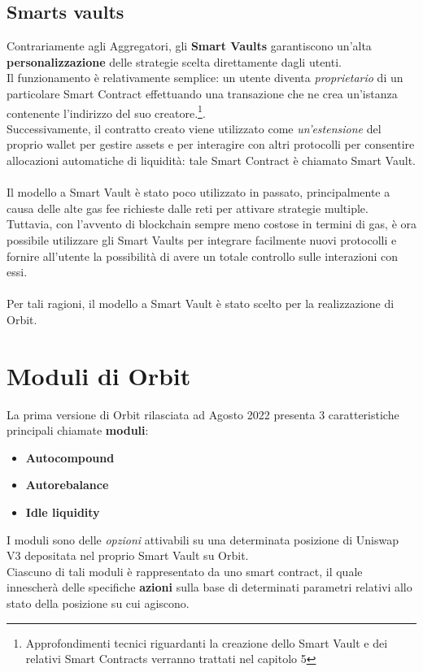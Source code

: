 \documentclass[12pt,a4paper]{report}
\begin{document}
\subsection{Smarts vaults}

Contrariamente agli Aggregatori, gli \textbf{Smart Vaults} garantiscono un'alta \textbf{personalizzazione} delle strategie scelta direttamente dagli utenti.
\\Il funzionamento è relativamente semplice: un utente diventa \textit{proprietario} di un particolare Smart Contract effettuando una transazione che ne crea un'istanza contenente l'indirizzo del suo creatore.\footnote{Approfondimenti tecnici riguardanti la creazione dello Smart Vault e dei relativi Smart Contracts verranno trattati nel capitolo 5}.
\\Successivamente, il contratto creato viene utilizzato come \textit{un'estensione} del proprio wallet per gestire assets e per interagire con altri protocolli per consentire allocazioni automatiche di liquidità: tale Smart Contract è chiamato Smart Vault.
\\\\Il modello a Smart Vault è stato poco utilizzato in passato, principalmente a causa delle alte gas fee richieste dalle reti per attivare strategie multiple.
\\Tuttavia, con l'avvento di blockchain sempre meno costose in termini di gas, è ora possibile utilizzare gli Smart Vaults per integrare facilmente nuovi protocolli e fornire all'utente la possibilità di avere un totale controllo sulle interazioni con essi.
\\\\Per tali ragioni, il modello a Smart Vault è stato scelto per la realizzazione di Orbit.

\section{Moduli di Orbit}

La prima versione di Orbit rilasciata ad Agosto 2022 presenta 3 caratteristiche principali chiamate \textbf{moduli}: 

\begin{itemize}
  \item \textbf{Autocompound}
  \item \textbf{Autorebalance}
  \item \textbf{Idle liquidity}
\end{itemize}
\textbf{\list}
\noindent I moduli sono delle \textit{opzioni} attivabili su una determinata posizione di Uniswap V3 depositata nel proprio Smart Vault su Orbit. \\Ciascuno di tali moduli è rappresentato da uno smart contract, il quale innescherà delle specifiche \textbf{azioni} sulla base di determinati parametri relativi allo stato della posizione su cui agiscono.
\end{document}
